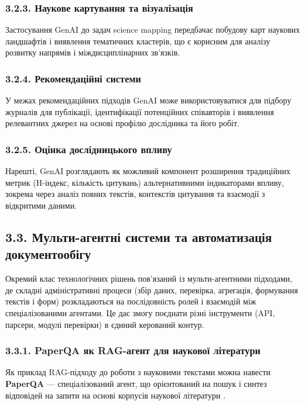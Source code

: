 \subsubsection*{3.2.3. Наукове картування та візуалізація}

Застосування GenAI до задач science mapping передбачає побудову карт наукових ландшафтів і виявлення тематичних кластерів, що є корисним для аналізу розвитку напрямів і міждисциплінарних зв'язків.

\subsubsection*{3.2.4. Рекомендаційні системи}

У межах рекомендаційних підходів GenAI може використовуватися для підбору журналів для публікації, ідентифікації потенційних співавторів і виявлення релевантних джерел на основі профілю дослідника та його робіт.

\subsubsection*{3.2.5. Оцінка дослідницького впливу}

Нарешті, GenAI розглядають як можливий компонент розширення традиційних метрик (H-індекс, кількість цитувань) альтернативними індикаторами впливу, зокрема через аналіз повних текстів, контекстів цитування та взаємодії з відкритими даними.

\subsection*{3.3. Мульти-агентні системи та автоматизація документообігу}

Окремий клас технологічних рішень пов'язаний із мульти-агентними підходами, де складні адміністративні процеси (збір даних, перевірка, агрегація, формування текстів і форм) розкладаються на послідовність ролей і взаємодій між спеціалізованими агентами. Це дає змогу поєднати різні інструменти (API, парсери, модулі перевірки) в єдиний керований контур.

\subsubsection*{3.3.1. PaperQA як RAG-агент для наукової літератури}

Як приклад RAG-підходу до роботи з науковими текстами можна навести \textbf{PaperQA} --- спеціалізований агент, що орієнтований на пошук і синтез відповідей на запити на основі корпусів наукової літератури \cite{ODonoghue2023PaperQA}.

